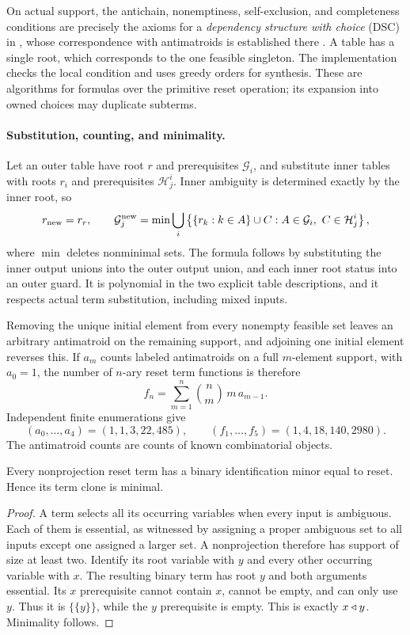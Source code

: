 On actual support, the antichain, nonemptiness, self-exclusion, and completeness conditions are precisely the axioms for a \emph{dependency structure with choice} (DSC) in \cite[Definition~2.9]{BazermanMinichielloPuzio2023}, whose correspondence with antimatroids is established there
\cite[Theorem~3.15]{BazermanMinichielloPuzio2023}. A table has a single root, which corresponds to the one feasible singleton. The implementation checks the local condition and uses greedy orders for synthesis. These are algorithms for formulas over the primitive reset operation; its expansion into owned choices may duplicate subterms.

\paragraph{Substitution, counting, and minimality.}
Let an outer table have root $r$ and prerequisites $\mathcal G_i$, and substitute inner tables with roots $r_i$ and prerequisites $\mathcal H^i_j$. Inner ambiguity is determined exactly by the inner root, so
\begin{equation}\label{reset:eq:substitution}
 r_{\rm new}=r_r,\qquad
 \mathcal G^{\rm new}_j=
 \min\bigcup_i
 \left\{\{r_k:k\in A\}\cup C:
       A\in\mathcal G_i,\ C\in\mathcal H^i_j\right\},
\end{equation}
where $\min$ deletes nonminimal sets. The formula follows by substituting the inner output unions into the outer output union, and each inner root status into an outer guard. It is polynomial in the two explicit table descriptions, and it respects actual term substitution, including mixed inputs.

Removing the unique initial element from every nonempty feasible set leaves an arbitrary antimatroid on the remaining support, and adjoining one initial element reverses this. If $a_m$ counts labeled antimatroids on a full $m$-element support, with $a_0=1$, the number of $n$-ary reset term functions is
therefore
\[
 f_n=\sum_{m=1}^n\binom nm\,m\,a_{m-1}.
\]
Independent finite enumerations give
\[
 (a_0,\ldots,a_4)=(1,1,3,22,485),\qquad
 (f_1,\ldots,f_5)=(1,4,18,140,2980).
\]
The antimatroid counts are counts of known combinatorial objects.

\begin{proposition}\label{reset:thm:minimal}
Every nonprojection reset term has a binary identification minor equal
to reset. Hence its term clone is minimal.
\end{proposition}
\begin{proof}
A term selects all its occurring variables when every input is
ambiguous. Each of them is essential, as witnessed by assigning a proper
ambiguous set to all inputs except one assigned a larger set.
A nonprojection therefore has support of size at least two. Identify
its root variable with $y$ and every other occurring variable with $x$.
The resulting binary term has root $y$ and both arguments essential.
Its $x$ prerequisite cannot contain $x$, cannot be empty, and can only
use $y$. Thus it is $\{\{y\}\}$, while the $y$ prerequisite is empty.
This is exactly $x\mathbin{\triangleleft} y$. Minimality follows.
\end{proof}

